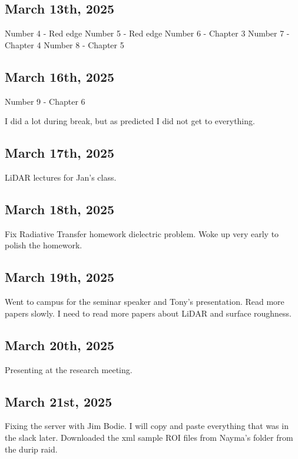 \documentclass{article}
\begin{document}
\subsection{March 13th, 2025}
Number 4 - Red edge
Number 5 - Red edge 
Number 6 - Chapter 3 
Number 7 - Chapter 4 
Number 8 - Chapter 5


\subsection{March 16th, 2025}

Number 9 - Chapter 6 

I did a lot during break, but as predicted I did not get to everything. 


\subsection{March 17th, 2025}
LiDAR lectures for Jan's class.


\subsection{March 18th, 2025}
Fix Radiative Transfer homework dielectric problem. 
Woke up very early to polish the homework. 

\subsection{March 19th, 2025}
Went to campus for the seminar speaker and Tony's presentation. 
Read more papers slowly. 
I need to read more papers about LiDAR and surface roughness.


\subsection{March 20th, 2025}
Presenting at the research meeting.

\subsection{March 21st, 2025}

Fixing the server with Jim Bodie. I will copy and paste everything that was in the slack later. 
Downloaded the xml sample ROI files from Nayma's folder from the durip raid. 
\end{document}
